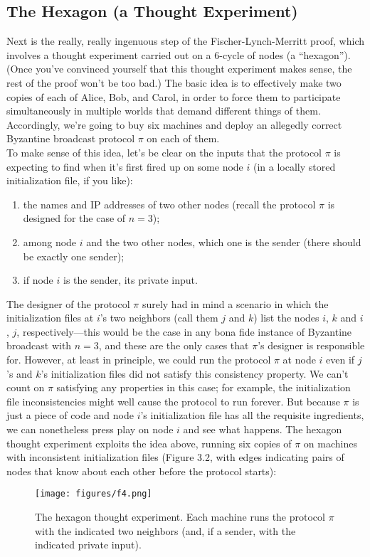 \subsection{The Hexagon (a Thought Experiment)}
Next is the really, really ingenuous step of the Fischer-Lynch-Merritt proof, which involves a
thought experiment carried out on a 6-cycle of nodes (a “hexagon”). (Once you've convinced
yourself that this thought experiment makes sense, the rest of the proof won’t be too bad.)
The basic idea is to effectively make two copies of each of Alice, Bob, and Carol, in
order to force them to participate simultaneously in multiple worlds that demand different
things of them. Accordingly, we’re going to buy six machines and deploy an allegedly correct
Byzantine broadcast protocol $\pi$ on each of them.\\
To make sense of this idea, let’s be clear on the inputs that the protocol $\pi$ is expecting
to find when it’s first fired up on some node $i$ (in a locally stored initialization file, if you
like):\\
\begin{enumerate}[label=(\alph*)]
    \item the names and IP addresses of two other nodes (recall the protocol $\pi$ is designed for
the case of $n = 3$);
    \item among node $i$ and the two other nodes, which one is the sender (there should be exactly
one sender);
    \item if node $i$ is the sender, its private input.
\end{enumerate}

The designer of the protocol $\pi$ surely had in mind a scenario in which the initialization
files at $i$’s two neighbors (call them $j$ and $k$) list the nodes $i$, $k$ and $i$, $j$, respectively—this
would be the case in any bona fide instance of Byzantine broadcast with $n = 3$, and these
are the only cases that $\pi$’s designer is responsible for. However, at least in principle, we
could run the protocol $\pi$ at node $i$ even if $j$’s and $k$’s initialization files did not satisfy
this consistency property. We can’t count on $\pi$ satisfying any properties in this case; for
example, the initialization file inconsistencies might well cause the protocol to run forever.
But because $\pi$ is just a piece of code and node $i$’s initialization file has all the requisite
ingredients, we can nonetheless press play on node $i$ and see what happens.
The hexagon thought experiment exploits the idea above, running six copies of $\pi$ on
machines with inconsistent initialization files (Figure 3.2, with edges indicating pairs of nodes
that know about each other before the protocol starts):
\begin{figure}[h]
    \centering
    \texttt{[image: figures/f4.png]}
    \caption{The hexagon thought experiment. Each machine runs the protocol $\pi$ with the
indicated two neighbors (and, if a sender, with the indicated private input).}
    \label{fig:mesh1}
\end{figure}\\


